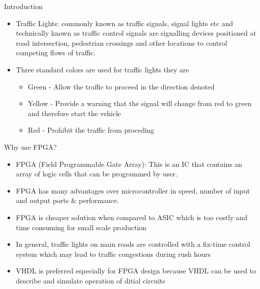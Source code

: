 \documentclass{beamer}
\begin{document}
\begin{frame}{Introduction}
  \begin{itemize}
  \item {
    Traffic Lights:
        commonly known as traffic signals, signal lights etc and technically known as traffic control signals are signalling devices positioned at road intersection, pedestrian crossings and other locations to control competing flows of traffic.
    \pause %
  }
  \item {   
    Three standard colors are used for traffic lights they are
    \begin{itemize}
        \item{ Green - Allow the traffic to proceed in the direction denoted}
        \item{ Yellow - Provide a warning that the signal will change from red to green and therefore start the vehicle}
        \item{Red - Prohibit the traffic from proceding }
    \end{itemize}
  }
  \end{itemize}
\end{frame}

\begin{frame}{Why use FPGA?}
  \begin{itemize}
  \item { FPGA (Field Programmable Gate Array): This is an IC that contains an array of logic cells that can be programmed by user.}
  \item { FPGA has many advantages over microcontroller in speed, number of input and output ports \& performance.}
  \item{FPGA is cheaper solution when compared to ASIC which is too costly and time consuming for small scale production}
  \item{In general, traffic lights on main roads are controlled with a fix-time control system which may lead to traffic congestions during rush hours}
  \item{VHDL is preferred especially for FPGA design because VHDL can be used to describe and simulate operation of ditial circuits}
  \end{itemize}
\end{frame}
\end{document}
